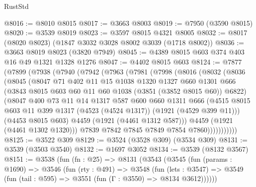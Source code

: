 \begin{lexlean}{RustStd}
\begin{coremodule}
@8016 := @8010 @8015
@8017 := @3663 @8003
@8019 := @7950 (@3590 @8015)
@8020 := @3539 @8019
@8023 := @3597 @8015 @4321 @8005
@8032 := @8017 (@8020 @8023) (@1847 @3032 @3028 @8002 @3039 (@1718 @8002))
@8036 := @3663 @8019 @8023 (@3820 @7949)
@8045 := @4389 @8015 @603 @374 @403 @16 @49 @1321 @1328 @1276
@8047 := @4402 @8015 @603
@8124 := @7877
    (@7899
      (@7938
        (@7940
          (@7942
            (@7963
              (@7981
                (@7998
                  (@8016
                    (@8032
                      (@8036
                        (@8045
                          (@8047
                            @71
                            @402
                            @11
                            @15
                            @1038
                            @1320
                            @1327
                            @660
                            @1301
                            @666
                            (@3843 @8015 @603 @60 @11 @60 @1038 (@3851 (@3852 @8015 @60)) @6822)
                            (@8047
                              @400
                              @73
                              @11
                              @14
                              @1317
                              @587
                              @600
                              @660
                              @1311
                              @666
                              (@4515
                                @8015
                                @603
                                @11
                                @399
                                @1317
                                (@4523 (@4524 @1317))
                                (@1921 (@4529 @399 @11)))
                              (@4453 @8015 @603)
                              @4459
                              (@1921 (@4461 @1312 @587)))
                            @4459
                            (@1921 (@4461 @1302 @1320)))
                          @7839
                          @7842
                          @7845
                          @7849
                          @7854
                          @7860)))))))))))
@8125 := @3522 @309
@8129 := @3524 (@3528 @309) (@3534 @309)
@8131 := @3539 (@3503 @3540)
@8132 := @1697 @3052
@8134 := @3539 (@8132 @3567)
@8151 := @3538
    (fun (fn : @25) =>
    @8131
      (@3543
        (@3545
          (fun (params : @1690) =>
          @3546
            (fun (rty : @491) =>
            @3548
              (fun (lets : @3547) =>
              @3549 (fun (tail : @595) => @3551 (fun (Γ : @3550) => @8134 @3612))))))

\end{coremodule}
\end{lexlean}
